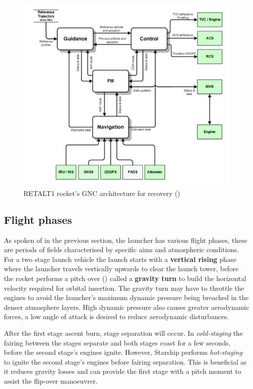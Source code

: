 \begin{figure}[H]
    \centering
    \includegraphics[width=0.95\linewidth]{figures/LiteratureStudy/GNC_architecture.png}
    \caption{RETALT1 rocket's GNC architecture for recovery (\cite{Botelho2022})}
    \label{fig:GNC_architecture}
\end{figure}

\subsection{Flight phases}
\label{sec:flight_phases}

As spoken of in the previous section, the launcher has various flight phases, these are periods of fields characterised by specific aims and atmospheric conditions.  For a two stage launch vehicle the launch starts with a \textbf{vertical rising} phase where the launcher travels vertically upwards to clear the launch tower, before the rocket performs a pitch over (\cite{Launcher_Trajectory}) called a \textbf{gravity turn} to build the horizontal velocity required for orbital insertion. The gravity turn may have to throttle the engines to avoid the launcher's maximum dynamic pressure being breached in the denser atmosphere layers. High dynamic pressure also causes greater aerodynamic forces, a low angle of attack is desired to reduce aerodynamic disturbances.

After the first stage ascent burn, stage separation will occur. In \textit{cold-staging} the fairing between the stages separate and both stages coast for a few seconds, before the second stage's engines ignite. However, Starship performs \textit{hot-staging} to ignite the second stage's engines before fairing separation. This is beneficial as it reduces gravity losses and can provide the first stage with a pitch moment to assist the flip-over manoeuvrer.

